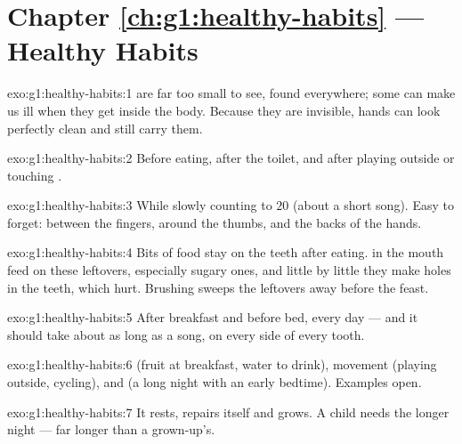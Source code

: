 \section*{Chapter \ref{ch:g1:healthy-habits} --- Healthy Habits}

\begin{solution}{exo:g1:healthy-habits:1}
 are  far too small to see, found everywhere;
some can make us ill when they get inside the body. Because they
are invisible, hands can look perfectly clean and still carry
them.
\end{solution}

\begin{solution}{exo:g1:healthy-habits:2}
Before eating, after the toilet, and after playing outside or
touching .
\end{solution}

\begin{solution}{exo:g1:healthy-habits:3}
While slowly counting to $20$ (about a short song). Easy to
forget: between the fingers, around the thumbs, and the backs of
the hands.
\end{solution}

\begin{solution}{exo:g1:healthy-habits:4}
Bits of food stay on the teeth after eating.  in the mouth
feed on these leftovers, especially sugary ones, and little by
little they make holes in the teeth, which hurt. Brushing sweeps
the leftovers away before the feast.
\end{solution}

\begin{solution}{exo:g1:healthy-habits:5}
After breakfast and before bed, every day --- and it should take
about as long as a song, on every side of every tooth.
\end{solution}

\begin{solution}{exo:g1:healthy-habits:6}
 (fruit at breakfast, water to drink), movement
(playing outside, cycling), and  (a long night with an early
bedtime). Examples open.
\end{solution}

\begin{solution}{exo:g1:healthy-habits:7}
It rests, repairs itself and grows. A child needs the longer night
--- far longer than a grown-up's.
\end{solution}

